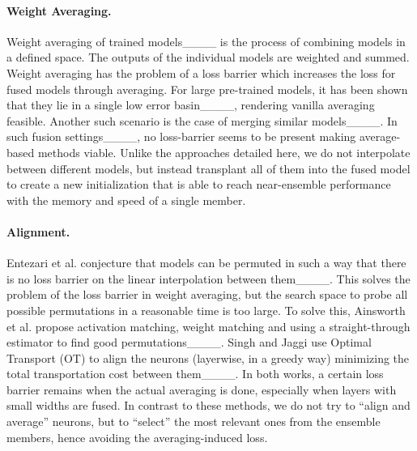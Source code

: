 \paragraph{Weight Averaging.}
Weight averaging of trained models____ is the process of combining models in a defined space. The outputs of the individual models are weighted and summed. Weight averaging has the problem of a loss barrier which increases the loss for fused models through averaging. For large pre-trained models, it has been shown that they lie in a single low error basin____, rendering vanilla averaging feasible. Another such scenario is the case of merging similar models____. In such fusion settings____, no loss-barrier seems to be present making average-based methods viable.
Unlike the approaches detailed here, we do not interpolate between different models, but instead transplant all of them into the fused model to create a new initialization that is able to reach near-ensemble performance with the memory and speed of a single member.

\paragraph{Alignment.} %
Entezari et al. conjecture that models can be permuted in such a way that there is no loss barrier on the linear interpolation between them____. This solves the problem of the loss barrier in weight averaging, but the search space to probe all possible permutations in a reasonable time is too large. To solve this, Ainsworth et al. propose activation matching, weight matching and using a straight-through estimator to find good permutations____. Singh and Jaggi use Optimal Transport (OT) to align the neurons (layerwise, in a greedy way) minimizing the total transportation cost between them____. In both works, a certain loss barrier remains when the actual averaging is done, especially when layers with small widths are fused. In contrast to these methods, we do not try to ``align and average'' neurons, but to ``select'' the most relevant ones from the ensemble members, hence avoiding the averaging-induced loss.

